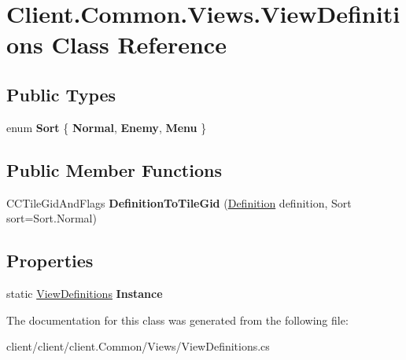 \hypertarget{classClient_1_1Common_1_1Views_1_1ViewDefinitions}{\section{Client.\-Common.\-Views.\-View\-Definitions Class Reference}
\label{classClient_1_1Common_1_1Views_1_1ViewDefinitions}
}
\subsection*{Public Types}
\begin{DoxyCompactItemize}
\item 
enum {\bfseries Sort} \{ {\bfseries Normal}, 
{\bfseries Enemy}, 
{\bfseries Menu}
 \}
\end{DoxyCompactItemize}
\subsection*{Public Member Functions}
\begin{DoxyCompactItemize}
\item 
\hypertarget{classClient_1_1Common_1_1Views_1_1ViewDefinitions_a2d57e9609ebd206365dca478851ce638}{C\-C\-Tile\-Gid\-And\-Flags {\bfseries Definition\-To\-Tile\-Gid} (\hyperlink{classCore_1_1Models_1_1Definitions_1_1Definition}{Definition} definition, Sort sort=Sort.\-Normal)}\label{classClient_1_1Common_1_1Views_1_1ViewDefinitions_a2d57e9609ebd206365dca478851ce638}

\end{DoxyCompactItemize}
\subsection*{Properties}
\begin{DoxyCompactItemize}
\item 
\hypertarget{classClient_1_1Common_1_1Views_1_1ViewDefinitions_a50a6b5a1d17e54b4de44ab983b8d4810}{static \hyperlink{classClient_1_1Common_1_1Views_1_1ViewDefinitions}{View\-Definitions} {\bfseries Instance}}\label{classClient_1_1Common_1_1Views_1_1ViewDefinitions_a50a6b5a1d17e54b4de44ab983b8d4810}

\end{DoxyCompactItemize}


The documentation for this class was generated from the following file\-:\begin{DoxyCompactItemize}
\item 
client/client/client.\-Common/\-Views/View\-Definitions.\-cs\end{DoxyCompactItemize}
